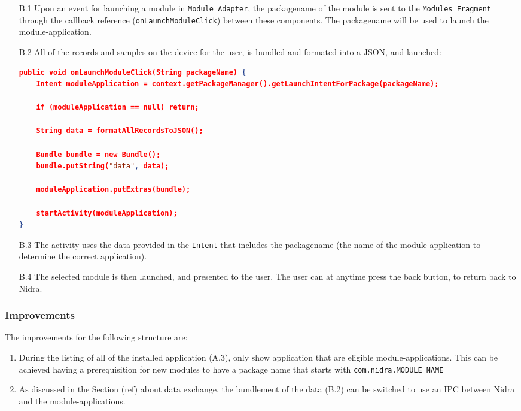 \begin{itemize}
    \item[B.1] Upon an event for launching a module in \verb|Module Adapter|, the packagename of the module is sent to the \verb|Modules Fragment| through the callback reference (\verb|onLaunchModuleClick|) between these components. The packagename  will be used to launch the module-application.
    \item[B.2] All of the records and samples on the device for the user, is bundled and formated into a JSON, and launched:
\begin{lstlisting}[language=json, caption={My Caption}, captionpos=b]
public void onLaunchModuleClick(String packageName) {
    Intent moduleApplication = context.getPackageManager().getLaunchIntentForPackage(packageName);

    if (moduleApplication == null) return;

    String data = formatAllRecordsToJSON();

    Bundle bundle = new Bundle();
    bundle.putString("data", data);

    moduleApplication.putExtras(bundle);

    startActivity(moduleApplication);
}
\end{lstlisting}

    \item[B.3] The activity uses the data provided in the \verb|Intent| that includes the packagename (the name of the module-application to determine the correct application).
    \item[B.4] The selected module is then launched, and presented to the user. The user can at anytime press the back button, to return back to Nidra.  
\end{itemize}

\subsubsection{Improvements}
The improvements for the following structure are:
\begin{enumerate}
    \item During the listing of all of the installed application (A.3), only show application that are eligible module-applications. This can be achieved having a prerequisition for new modules to have a package name that starts with \verb|com.nidra.MODULE_NAME|
    \item As discussed in the Section (ref) about data exchange, the bundlement of the data (B.2) can be switched to use an IPC between Nidra and the module-applications. 
\end{enumerate}

